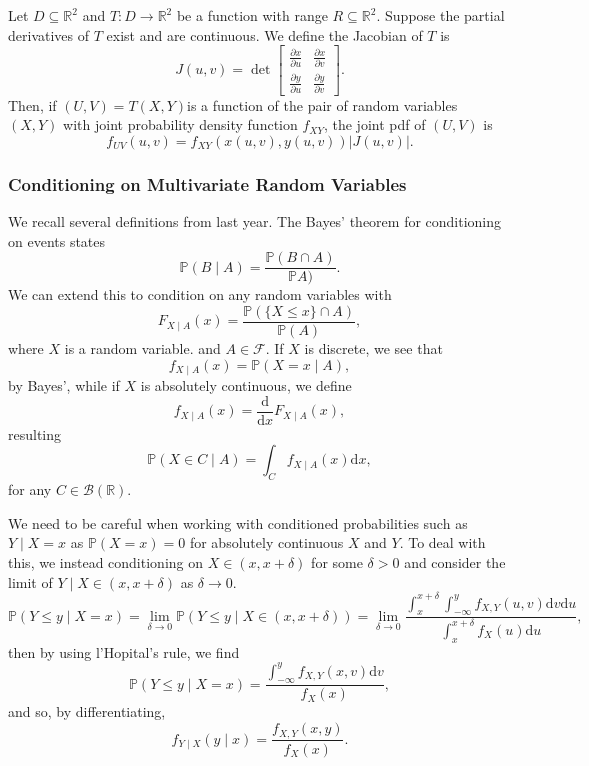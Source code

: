 \documentclass[
]{article}
\theoremstyle{definition}
\begin{document}
Let \(D \subseteq \mathbb{R}^2\) and \(T : D \to \mathbb{R}^2\) be a
function with range \(R \subseteq \mathbb{R}^2\). Suppose the partial
derivatives of \(T\) exist and are continuous. We define the Jacobian of
\(T\) is \[J(u, v) = \det\begin{bmatrix}
  \frac{\partial{x}}{\partial{u}} & \frac{\partial{x}}{\partial{v}}\\
  \frac{\partial{y}}{\partial{u}} & \frac{\partial{y}}{\partial{v}}
\end{bmatrix}.\] Then, if \((U, V) = T(X, Y)\)is a function of the pair
of random variables \((X, Y)\) with joint probability density function
\(f_{XY}\), the joint pdf of \((U, V)\) is
\[f_{UV}(u, v) = f_{XY}(x(u, v), y(u, v))\left|J(u, v)\right|.\]

\hypertarget{conditioning-on-multivariate-random-variables}{%
\subsubsection{Conditioning on Multivariate Random
Variables}\label{conditioning-on-multivariate-random-variables}}

We recall several definitions from last year. The Bayes' theorem for
conditioning on events states
\[\mathbb{P}(B \mid A) = \frac{\mathbb{P}(B \cap A)}{\mathbb{P}A)}.\] We
can extend this to condition on any random variables with
\[F_{X \mid A}(x) =\frac{\mathbb{P}(\{X \le x\} \cap A)}{\mathbb{P}(A)},\]
where \(X\) is a random variable. and \(A \in \mathcal{F}\). If \(X\) is
discrete, we see that \[f_{X \mid A}(x) = \mathbb{P}(X = x \mid A),\] by
Bayes', while if \(X\) is absolutely continuous, we define
\[f_{X \mid A}(x) = \frac{\text{d}}{\text{d}x}F_{X \mid A}(x),\]
resulting
\[\mathbb{P}(X \in C \mid A) = \int_{C} f_{X \mid A}(x) \text{d}x,\] for
any \(C \in \mathcal{B}(\mathbb{R})\).

We need to be careful when working with conditioned probabilities such
as \(Y \mid X = x\) as \(\mathbb{P}(X = x) = 0\) for absolutely
continuous \(X\) and \(Y\). To deal with this, we instead conditioning
on \(X \in (x, x + \delta)\) for some \(\delta > 0\) and consider the
limit of \(Y \mid X \in (x, x + \delta)\) as \(\delta \to 0\).
\[\mathbb{P}(Y \le y \mid X = x)
  = \lim_{\delta \to 0}\mathbb{P}(Y \le y \mid X \in (x, x + \delta)) 
  = \lim_{\delta \to 0}
    \frac{\int_x^{x + \delta} \int_{-\infty}^y f_{X, Y}(u, v) \text{d}v \text{d}u}
    {\int_x^{x + \delta} f_X(u)\text{d}u},
\] then by using l'Hopital's rule, we find
\[\mathbb{P}(Y \le y \mid X = x) = 
  \frac{\int_{-\infty}^y f_{X, Y}(x, v) \text{d}v}{f_X(x)},\] and so, by
differentiating,
\[f_{Y \mid X}(y \mid x) = \frac{f_{X, Y}(x, y)}{f_X(x)}.\]
\end{document}
